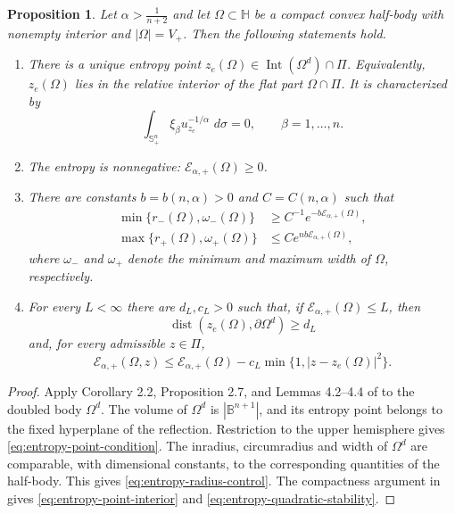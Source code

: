 \documentclass[11pt, reqno]{amsart}
\newtheorem{proposition}[theorem]{Proposition}
\theoremstyle{remark}
\theoremstyle{definition}
\numberwithin{equation}{section}
\DeclareMathOperator{\dist}{dist}
\DeclareMathOperator{\Int}{Int}
\newcommand{\Sph}{\mathbb S}
\newcommand{\B}{\mathbb B}
\newcommand{\HH}{\mathbb H}
\newcommand{\PiH}{\Pi}
\newcommand{\cE}{\mathcal E}
\newcommand{\dd}{\,d}
\begin{document}
\begin{proposition}\label{prop:half-entropy-geometry}
Let $\alpha > \frac{1}{n+2}$ and let $\Omega\subset\HH$ be a compact convex half-body
with nonempty interior and $|\Omega|=V_+$.  Then the following statements hold.
\begin{enumerate}[label=\rm(\roman*)]
\item There is a unique entropy point $z_e(\Omega)\in\Int(\Omega^d)\cap\PiH$.  Equivalently, $z_e(\Omega)$ lies in the relative interior of the flat part $\Omega\cap\PiH$.
It is characterized by
\begin{equation}\label{eq:entropy-point-condition}
        \int_{\Sph^n_+}\xi_\beta u_{z_e}^{-1/\alpha}\,\dd\sigma=0,
        \qquad \beta=1,\ldots,n.
\end{equation}
\item The entropy is nonnegative: $ \cE_{\alpha,+}(\Omega)\ge0$.  
\item There are constants $b=b(n,\alpha)>0$ and $C=C(n,\alpha)$ such that
\begin{equation}\label{eq:entropy-radius-control}
\begin{split}
        \min\{r_-(\Omega),\omega_-(\Omega)\}
        &\ge C^{-1}e^{-b\cE_{\alpha,+}(\Omega)},\\
        \max\{r_+(\Omega),\omega_+(\Omega)\}
        &\le Ce^{nb\cE_{\alpha,+}(\Omega)},
\end{split}
\end{equation}
where $\omega_-$ and $\omega_+$ denote the minimum and maximum width of $\Omega$, respectively. 
\item For every $L<\infty$ there are $d_L,c_L>0$ such that, if
$\cE_{\alpha,+}(\Omega)\le L$, then
\begin{equation}\label{eq:entropy-point-interior}
        \dist(z_e(\Omega),\partial\Omega^d)\ge d_L
\end{equation}
and, for every admissible $z\in\PiH$,
\begin{equation}\label{eq:entropy-quadratic-stability}
        \cE_{\alpha,+}(\Omega,z)
        \le \cE_{\alpha,+}(\Omega)
        -c_L\min\{1,|z-z_e(\Omega)|^2\}.
\end{equation}
\end{enumerate}
\end{proposition}

\begin{proof}
Apply Corollary 2.2, Proposition 2.7, and Lemmas 4.2--4.4 of
\cite{AGN2016} to the doubled body $\Omega^d$.  The volume of $\Omega^d$ is
$|\B^{n+1}|$, and its entropy point belongs to the fixed hyperplane of the
reflection.  Restriction to the upper hemisphere gives
\eqref{eq:entropy-point-condition}.  The inradius, circumradius and width of
$\Omega^d$ are comparable, with dimensional constants, to the corresponding
quantities of the half-body.  This gives \eqref{eq:entropy-radius-control}.
The compactness argument in \cite[Lemmas 4.2--4.4]{AGN2016} gives
\eqref{eq:entropy-point-interior} and
\eqref{eq:entropy-quadratic-stability}.
\end{proof}
\end{document}
